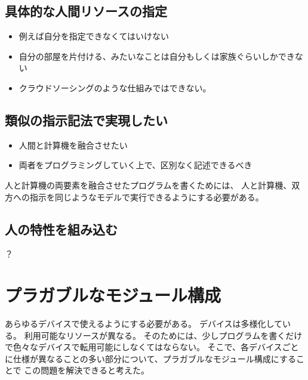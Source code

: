 \subsection{具体的な人間リソースの指定}\label{ux5177ux4f53ux7684ux306aux4ebaux9593ux30eaux30bdux30fcux30b9ux306eux6307ux5b9a}

\begin{itemize}
\itemsep1pt\parskip0pt
\item
  例えば自分を指定できなくてはいけない
\item
  自分の部屋を片付ける、みたいなことは自分もしくは家族ぐらいしかできない
\item
  クラウドソーシングのような仕組みではできない。
\end{itemize}

\subsection{類似の指示記法で実現したい}\label{ux985eux4f3cux306eux6307ux793aux8a18ux6cd5ux3067ux5b9fux73feux3057ux305fux3044}

\begin{itemize}
\itemsep1pt\parskip0pt
\item
  人間と計算機を融合させたい
\item
  両者をプログラミングしていく上で、区別なく記述できるべき
\end{itemize}

人と計算機の両要素を融合させたプログラムを書くためには、
人と計算機、双方への指示を同じようなモデルで実行できるようにする必要がある。

\subsection{人の特性を組み込む}\label{ux4ebaux306eux7279ux6027ux3092ux7d44ux307fux8fbcux3080}

？

\section{プラガブルなモジュール構成}\label{ux30d7ux30e9ux30acux30d6ux30ebux306aux30e2ux30b8ux30e5ux30fcux30ebux69cbux6210}

あらゆるデバイスで使えるようにする必要がある。
デバイスは多様化している。 利用可能なリソースが異なる。
そのためには、少しプログラムを書くだけで色々なデバイスで転用可能にしなくてはならない。
そこで、各デバイスごとに仕様が異なることの多い部分について、プラガブルなモジュール構成にすることで
この問題を解決できると考えた。

